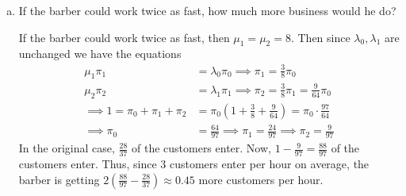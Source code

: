 \documentclass{article}
\begin{document}
\begin{itemize}
\begin{enumerate}[(a)]
			\item If the barber could work twice as fast, how much more business would he do?
				\begin{soln}
					If the barber could work twice as fast, then $\mu_1=\mu_2=8.$ Then since $\lambda_0, \lambda_1$ are unchanged we have the equations
					\begin{align*}
						\mu_1\pi_1&=\lambda_0\pi_0 \implies \pi_1 = \frac{3}{8} \pi_0 \\
						\mu_2\pi_2 &= \lambda_1\pi_1 \implies \pi_2 = \frac{3}{8}\pi_1 = \frac{9}{64} \pi_0 \\
						\implies 1=\pi_0+\pi_1+\pi_2 &= \pi_0\left( 1+\frac{3}{8} + \frac{9}{64} \right) = \pi_0\cdot \frac{97}{64} \\
						\implies \pi_0 &= \frac{64}{97} \implies \pi_1 = \frac{24}{97}\implies \pi_2 = \frac{9}{97}
					\end{align*}
					In the original case, $\frac{28}{37}$ of the customers enter. Now, $1-\frac{9}{97} = \frac{88}{97}$ of the customers enter. Thus, since 3 customers enter per hour on average, the barber is getting $2\left( \frac{88}{97} - \frac{28}{37} \right)\approx 0.45$ more customers per hour.
				\end{soln}
				
		\end{enumerate}


\end{itemize}
\end{document}
